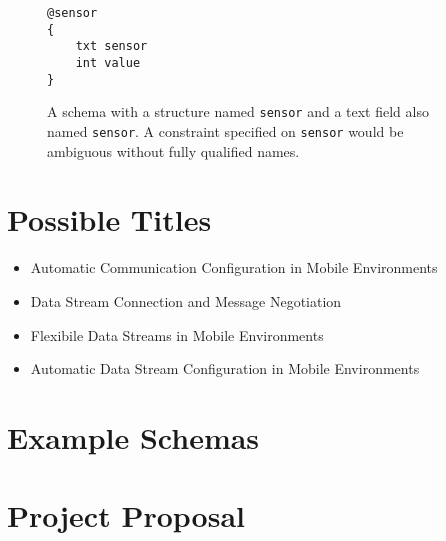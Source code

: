 \documentclass[12pt,twoside,notitlepage]{report}
\begin{document}
\begin{figure}[h]
\begin{lstlisting}
@sensor
{
	txt sensor
	int value
}
\end{lstlisting}
\caption[Schema with repeated name]{A schema with a structure named {\tt sensor} and a text field also named {\tt sensor}. A constraint specified on {\tt sensor} would be ambiguous without fully qualified names.}
\label{fig:repeatednameschema}
\end{figure}

\cleardoublepage


\nocite{*}

\cleardoublepage

\appendix

\chapter{Possible Titles}

\begin{itemize}
\item Automatic Communication Configuration in Mobile Environments
\item Data Stream Connection and Message Negotiation
\item Flexibile Data Streams in Mobile Environments
\item Automatic Data Stream Configuration in Mobile Environments
\end{itemize}

\cleardoublepage

\chapter{Example Schemas}



\cleardoublepage

\chapter{Project Proposal}


\end{document}
